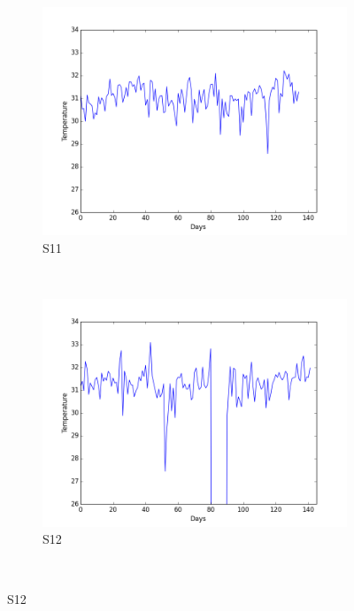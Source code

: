 \documentclass[12pt]{article} %
\begin{document}
\begin{figure}[H]
    \centering
    \begin{subfigure}[b]{0.30\textwidth}
        \includegraphics[width=\textwidth]{img/graphs/11-skintemp-1}
        \caption{S11}
        \label{fig:s11ST}
    \end{subfigure}
    ~ %
    \begin{subfigure}[b]{0.30\textwidth}
        \includegraphics[width=\textwidth]{img/graphs/12-skintemp-1}
        \caption{S12}
        \label{fig:s12ST}
    \end{subfigure}
    ~ %

\end{figure}
\end{document}
